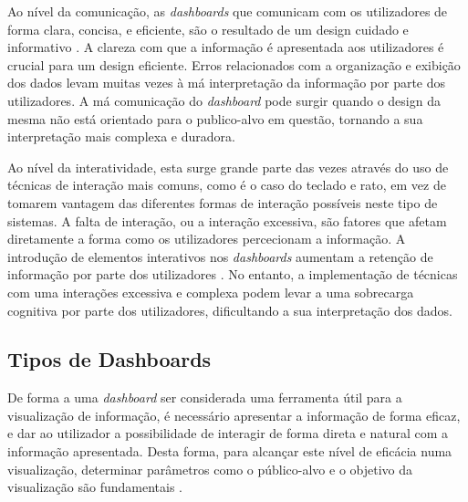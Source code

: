Ao nível da comunicação, as \textit{dashboards} que comunicam com os utilizadores de forma clara, concisa, e eficiente, são o resultado de um design cuidado e informativo \cite{few2005common}. A clareza com que a informação é apresentada aos utilizadores é crucial para um design eficiente. Erros relacionados com a organização e exibição dos dados levam muitas vezes à má interpretação da informação por parte dos utilizadores. A má comunicação do \textit{dashboard} pode surgir quando o design da mesma não está orientado para o publico-alvo em questão, tornando a sua interpretação mais complexa e duradora.

Ao nível da interatividade, esta surge grande parte das vezes através do uso de técnicas de interação mais comuns, como é o caso do teclado e rato, em vez de tomarem vantagem das diferentes formas de interação possíveis neste tipo de sistemas. A falta de interação, ou a interação excessiva, são fatores que afetam diretamente a forma como os utilizadores percecionam a informação. A introdução de elementos interativos nos \textit{dashboards} aumentam a retenção de informação por parte dos utilizadores \cite{heer2012interactive}. No entanto, a implementação de técnicas com uma interações excessiva e complexa podem levar a uma sobrecarga cognitiva por parte dos utilizadores, dificultando a sua interpretação dos dados.


\subsection{Tipos de Dashboards} %
\label{sub:tipos_dashboards}
De forma a uma \textit{dashboard} ser considerada uma ferramenta útil para a visualização de informação, é necessário apresentar a informação de forma eficaz, e dar ao utilizador a possibilidade de interagir de forma direta e natural com a informação apresentada. Desta forma, para alcançar este nível de eficácia numa visualização, determinar parâmetros como o público-alvo e o objetivo da visualização são fundamentais \cite{pappas2011riding}.

